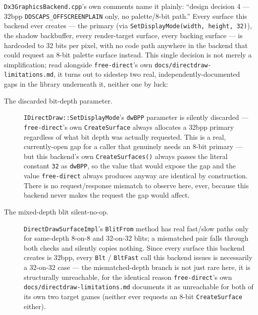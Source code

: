 \texttt{Dx3GraphicsBackend.cpp}'s own comments name it plainly: ``design decision 4 --- 32bpp
\texttt{DDSCAPS\_OFFSCREENPLAIN} only, no palette/8-bit path.'' Every surface this backend ever
creates --- the primary (via \texttt{SetDisplayMode(width, height, 32)}), the shadow backbuffer,
every render-target surface, every  backing surface --- is hardcoded to
32 bits per pixel, with no code path anywhere in the backend that could request an 8-bit
palette surface instead. This single decision is not merely a simplification; read alongside
\texttt{free-direct}'s own \texttt{docs/directdraw-limitations.md}, it turns out to sidestep
two real, independently-documented gaps in the library underneath it, neither one by luck:

\begin{description}
  \item[The discarded bit-depth parameter.] \texttt{IDirectDraw::SetDisplayMode}'s
        \texttt{dwBPP} parameter is silently discarded --- \texttt{free-direct}'s own
        \texttt{CreateSurface} always allocates a
        32bpp primary regardless of what bit depth was actually requested. This is a real,
        currently-open gap for a caller that genuinely needs an 8-bit primary --- but this
        backend's own \texttt{CreateSurfaces()} always passes the literal constant \texttt{32}
        as \texttt{dwBPP}, so the value that would expose the gap and the value \texttt{free-direct}
        always produces anyway are identical by construction. There is no request/response
        mismatch to observe here, ever, because this backend never makes the request the gap
        would affect.
  \item[The mixed-depth blit silent-no-op.] \texttt{DirectDrawSurfaceImpl}'s \texttt{BlitFrom}
        method has real fast/slow paths only for same-depth 8-on-8 and 32-on-32 blits; a mismatched pair
        falls through both checks and silently copies nothing. Since every surface this backend
        creates is 32bpp, every \texttt{Blt} / \texttt{BltFast} call this backend issues is
        necessarily a 32-on-32 case --- the mismatched-depth branch is not just rare here, it is
        structurally unreachable, for the identical reason \texttt{free-direct}'s own
        \texttt{docs/directdraw-limitations.md} documents it as unreachable for both of its own
        two target games (neither ever requests an 8-bit \texttt{CreateSurface} either).
\end{description}

